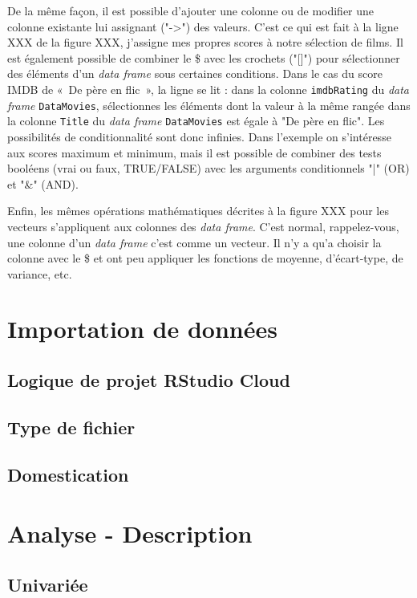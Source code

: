 \documentclass[10.5pt,a4paper]{article}
\begin{document}
    De la même façon, il est possible d'ajouter une colonne ou de modifier une colonne existante lui assignant ("->") des valeurs. C'est ce qui est fait à la ligne XXX de la figure XXX, j'assigne mes propres scores à notre sélection de films. Il est également possible de combiner le \$ avec les crochets ("[]") pour sélectionner des éléments d'un \emph{data frame} sous certaines conditions. Dans le cas du score IMDB de «~De père en flic~», la ligne se lit : dans la colonne \texttt{imdbRating} du \emph{data frame} \texttt{DataMovies}, sélectionnes les éléments dont la valeur à la même rangée dans la colonne \texttt{Title} du \emph{data frame} \texttt{DataMovies} est égale à "De père en flic". Les possibilités de conditionnalité sont donc infinies. Dans l'exemple on s'intéresse aux scores maximum et minimum, mais il est possible de combiner des tests booléens (vrai ou faux, TRUE/FALSE) avec les arguments conditionnels "|" (OR) et "\&" (AND). 
    
    Enfin, les mêmes opérations mathématiques décrites à la figure XXX pour les vecteurs s'appliquent aux colonnes des \emph{data frame}. C'est normal, rappelez-vous, une colonne d'un \emph{data frame} c'est comme un vecteur. Il n'y a qu'a choisir la colonne avec le \$ et ont peu appliquer les fonctions de moyenne, d'écart-type, de variance, etc.

  
\section{Importation de données}\label{import}
  \subsection{Logique de projet RStudio Cloud}
  \subsection{Type de fichier}
  \subsection{Domestication}

  
\section{Analyse - Description}
  \subsection{Univariée}
\end{document}
